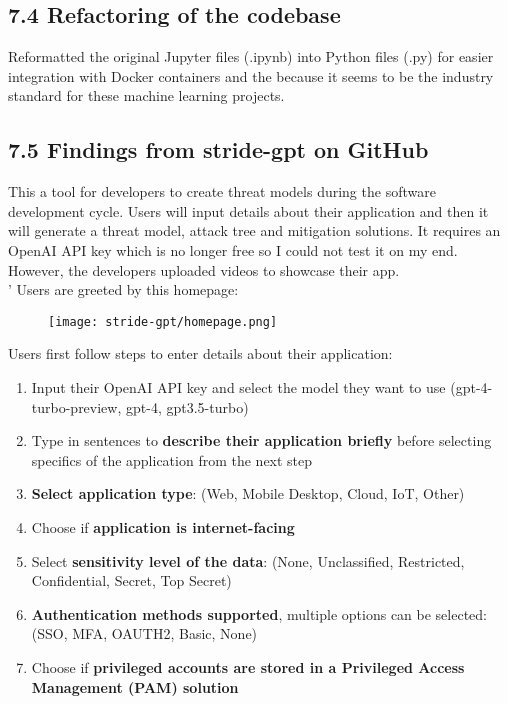 \subsection*{7.4 Refactoring of the codebase}
Reformatted the original Jupyter files (.ipynb) into Python files (.py) for easier integration with Docker containers and the because it seems to be the industry standard for these machine learning projects.

\subsection*{7.5 Findings from stride-gpt on GitHub}
This a tool for developers to create threat models during the software development cycle. Users will input details about their application and then it will generate a threat model, attack tree and mitigation solutions. It requires an OpenAI API key which is no longer free so I could not test it on my end. However, the developers uploaded videos to showcase their app. \\'
Users are greeted by this homepage:
\begin{figure}[htbp]
    \centering
    \texttt{[image: stride-gpt/homepage.png]}
\end{figure}

Users first follow steps to enter details about their application:
\begin{enumerate}[topsep=0pt]
    \item Input their OpenAI API key and select the model they want to use (gpt-4-turbo-preview, gpt-4, gpt3.5-turbo)
    \item Type in sentences to \textbf{describe their application briefly} before selecting specifics of the application from the next step
    \item \textbf{Select application type}: (Web, Mobile Desktop, Cloud, IoT, Other)
    \item Choose if \textbf{application is internet-facing}
    \item Select \textbf{sensitivity level of the data}: (None, Unclassified, Restricted, Confidential, Secret, Top Secret)
    \item \textbf{Authentication methods supported}, multiple options can be selected: (SSO, MFA, OAUTH2, Basic, None)
    \item Choose if \textbf{privileged accounts are stored in a Privileged Access Management (PAM) solution}
\end{enumerate}
\clearpage

